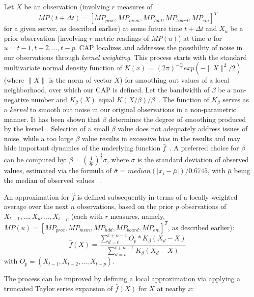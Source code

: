\documentclass[acmtaco]{acmtrans2m}
\begin{document}
Let $X$ be an observation (involving $r$ measures of 
\begin{equation*}
MP(t+\Delta t) =[MP_{proc},MP_{mem}, MP_{hdd}, MP_{board}, MP_{em}]^{T}
\end{equation*}
for a given server, as described earlier) at some future time $t+\Delta
t$ and $X_{u}$ be a prior observation (involving $r$ metric readings of
$MP(u)$) at time $u$ for $u=t-1, t-2, \dots, t-p$.  CAP localizes and
addresses the possibility of noise in our observations through
\textit{kernel weighting}.  This process starts with the standard
multivariate normal density function of $K(x)$ =
$(2\pi)^{-\frac{m}{2}}exp(-\|X\|^{2}/2)$ (where $\|X\|$ is the norm of
vector $X$) for smoothing out values of a local neighborhood, over which
our CAP is defined.  Let the bandwidth of $\beta$ be a non-negative
number and $K_{\beta}(X)$ equal $K(X/\beta)/\beta$~\cite{Fan1996}.  The
function of $K_{\beta}$ serves as a \textit{kernel} to smooth out noise
in our original observations in a non-parametric manner.  It has been
shown that $\beta$ determines the degree of smoothing produced by the
kernel~\cite{Fan2005}.  Selection of a small $\beta$ value does not
adequately address issues of noise, while a too large $\beta$ value
results in excessive bias in the results and may hide important dynamics
of the underlying function $\hat{f}$~\cite{Turlach1993}.  A preferred
choice for $\beta$ can be computed by: $\beta =
\left(\frac{4}{3p}\right)^{\frac{1}{5}}\sigma$, where $\sigma$ is the
standard deviation of observed values, estimated via the formula of
$\bar{\sigma}$ = $median(|x_{i}-\bar{\mu}|)/0.6745$, with $\bar{\mu}$
being the median of observed values ~\cite{Bowman1997}.
 
An approximation for $\hat{f}$ is defined subsequently in terms of
a locally weighted average \cite{Box1994,Fan1996} over the next
$n$ observations, based on the prior $p$ observations of $X_{t-1},
\ldots, X_{u}, \ldots, X_{t-p}$ (each with $r$ measures, namely,
$MP(u) = \left[MP_{proc}, MP_{mem}, MP_{hdd}, MP_{board}, MP_{em}\right]^{T}$,
as described earlier):
  \begin{equation}
    \label{eq:localconst}
    \hat{f}(X)=\dfrac{\displaystyle\sum_{d=t}^{t+n-1}O_{p}*K_{\beta}(X_{d}-X)}{\displaystyle\sum_{d=t}^{t+n-1}K_{\beta}(X_{d}-X)}\nonumber
  \end{equation}
with $O_{p}=(X_{t-1}, X_{t-2}, \ldots, X_{t-p})$.
 
The process can be improved by defining a local approximation
via applying a truncated Taylor series expansion of $\hat{f}(X)$ for $X$ at nearby $x$:
\end{document}
